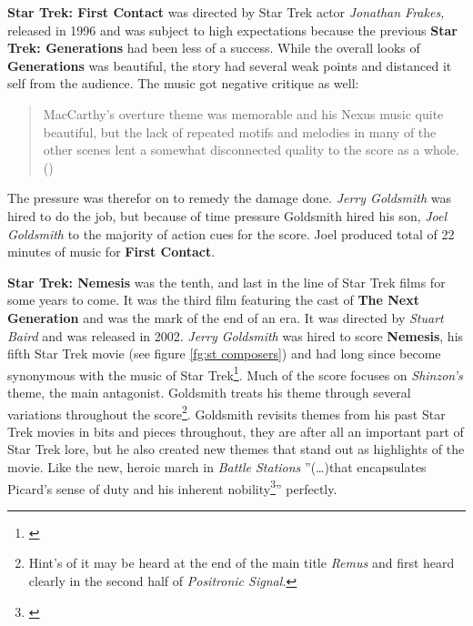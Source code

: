 \textbf{Star Trek: First Contact} was directed by Star Trek actor \textit{Jonathan Frakes,} released in 1996 and was subject to high expectations because the previous \textbf{Star Trek: Generations} had been less of a success. While the overall looks of \textbf{Generations} was beautiful, the story had several weak points and distanced it self from the audience. The music got negative critique as well: \blockquote{MacCarthy's overture theme was memorable and his Nexus music quite beautiful, but the lack of repeated motifs and melodies in many of the other scenes lent a somewhat disconnected quality to the score as a whole. (\citealt[p.152]{bond_music_1998})} The pressure was therefor on to remedy the damage done. \textit{Jerry Goldsmith} was hired to do the job, but because of time pressure Goldsmith hired his son, \textit{Joel Goldsmith} to the majority of action cues for the score. Joel produced total of 22 minutes of music for \textbf{First Contact}. 


\textbf{Star Trek: Nemesis} was the tenth, and last in the line of Star Trek films for some years to come. It was the third film featuring the cast of \textbf{The Next Generation} and was the mark of the end of an era. It was directed by \textit{Stuart Baird} and was released in 2002. \textit{Jerry Goldsmith} was hired to score \textbf{Nemesis}, his fifth Star Trek movie (see figure \ref{fg:st composers}) and had long since become synonymous with the music of Star Trek\footnote{\citealt{bond_2013}}. Much of the score focuses on \textit{Shinzon's} theme, the main antagonist. Goldsmith treats his theme through several variations throughout the score\footnote{Hint's of it may be heard at the end of the main title \textit{Remus} and first heard clearly in the second half of \textit{Positronic Signal.}}. Goldsmith revisits themes from his past Star Trek movies in bits and pieces throughout, they are after all an important part of Star Trek lore, but he also created new themes that stand out as highlights of the movie. Like the new, heroic march in \textit{Battle Stations} ''(\ldots)that encapsulates Picard's sense of duty and his inherent nobility\footnote{\citealt{bond_2013}}'' perfectly.

